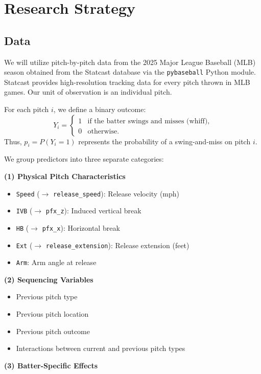 \documentclass[11pt]{article}
\begin{document}
\section{Research Strategy}
\subsection{Data}
We will utilize pitch-by-pitch data from the 2025 Major League Baseball (MLB) season obtained from the Statcast database via the \texttt{pybaseball} Python module. 
Statcast provides high-resolution tracking data for every pitch thrown in MLB games.
Our unit of observation is an individual pitch.

For each pitch $i$, we define a binary outcome:
\[
Y_i =
\begin{cases}
1 & \text{if the batter swings and misses (whiff)}, \\
0 & \text{otherwise.}
\end{cases}
\]
Thus, $p_i = P(Y_i = 1)$ represents the probability of a swing-and-miss on pitch $i$.

We group predictors into three separate categories:

\textbf{(1) Physical Pitch Characteristics}
\begin{itemize}
    \item \texttt{Speed} ($\to$ \texttt{release\_speed}): Release velocity (mph)
    \item \texttt{IVB} ($\to$ \texttt{pfx\_z}): Induced vertical break
    \item \texttt{HB} ($\to$ \texttt{pfx\_x}): Horizontal break
    \item \texttt{Ext} ($\to$ \texttt{release\_extension}): Release extension (feet)
    \item \texttt{Arm}: Arm angle at release
\end{itemize}

\textbf{(2) Sequencing Variables}
\begin{itemize}
    \item Previous pitch type
    \item Previous pitch location
    \item Previous pitch outcome
    \item Interactions between current and previous pitch types
\end{itemize}

\textbf{(3) Batter-Specific Effects}
\end{document}
